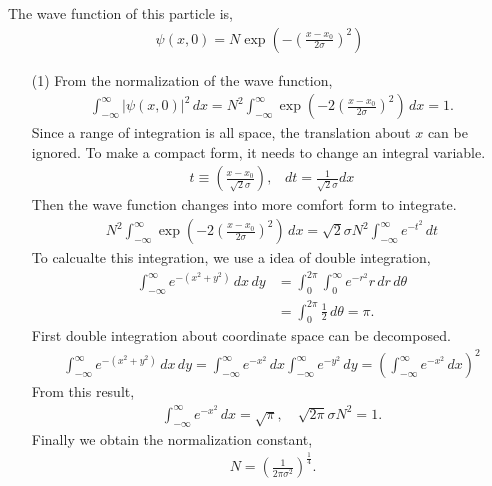 \documentclass[aps,floatfix,nofootinbib,superscriptaddress,fleqn]{revtex4}
\begin{document}
The wave function of this particle is,
\begin{align}
  \psi(x,0)=N \exp\left(-{\left(\frac{x-x_0}{2\sigma}\right)}^2\right)
\end{align}
\begin{itemize}

  \item[(1)] From the normalization of the wave function,
    \begin{align}
      \int_{-\infty}^{\infty} |\psi(x,0)|^2\,dx=N^2\int_{-\infty}^{\infty}\exp\left(-2{\left(\frac{x-x_0}{2\sigma}\right)}^2\right) \,dx =1.
    \end{align}
  Since a range of integration is all space, the translation about $x$ can be ignored.
  To make a compact form, it needs to change an integral variable.
    \begin{align}
      t \equiv \left(\frac{x-x_0}{\sqrt{2}\sigma}\right),\;\;\; dt = \frac{1}{\sqrt{2}\sigma} dx 
    \end{align}
  Then the wave function changes into more comfort form to integrate.
    \begin{align}
      N^2\int_{-\infty}^{\infty}\exp\left(-2{\left(\frac{x-x_0}{2\sigma}\right)}^2\right) \,dx
      =\sqrt{2}\sigma N^2\int_{-\infty}^{\infty} e^{-t^2} \,dt
    \end{align}
  To calcualte this integration, we use a idea of double integration,
    \begin{align}
      \int_{-\infty}^{\infty} e^{-(x^2+y^2)}\,dx\,dy &= \int_{0}^{2\pi}\int_{0}^{\infty} e^{-r^2}r\,dr\,d\theta
      \\   &= \int_{0}^{2\pi}\frac{1}{2}\,d\theta = \pi.
    \end{align}
  First double integration about coordinate space can be decomposed.
    \begin{align}
      \int_{-\infty}^{\infty} e^{-(x^2+y^2)}\,dx\,dy 
      = \int_{-\infty}^{\infty} e^{-x^2}\,dx\int_{-\infty}^{\infty}e^{-y^2}\,dy
      = \left(\int_{-\infty}^{\infty} e^{-x^2}\,dx\right)^2
    \end{align}
  From this result,
    \begin{align}
      \int_{-\infty}^{\infty} e^{-x^2} \,dx = \sqrt{\pi},\quad \sqrt{2\pi}\sigma N^2 =1.
    \end{align}
  Finally we obtain the normalization constant,
    \begin{align}
      \,N = {\left(\frac{1}{2\pi\sigma^2}\right)}^{\frac{1}{4}}.
    \end{align}


\end{itemize}
\end{document}
